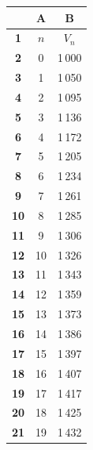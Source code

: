 \documentclass[10pt]{article}
\begin{document}
\begin{minipage}[t]{0.2\textwidth}
\vspace{0pt}
\centering
\renewcommand{\arraystretch}{1.2}
\begin{tabular}{|>{\columncolor{lightgray}}c|c|c|}
\hline
\rowcolor{lightgray}
\textbf{} & \textbf{A} & \textbf{B} \\ \hline
\textbf{1} & $n$ & $V_n$ \\ \hline
\textbf{2} & 0 & 1\,000 \\ \hline
\textbf{3} & 1 & 1\,050 \\ \hline
\textbf{4} & 2 & 1\,095 \\ \hline
\textbf{5} & 3 & 1\,136 \\ \hline
\textbf{6} & 4 & 1\,172 \\ \hline
\textbf{7} & 5 & 1\,205 \\ \hline
\textbf{8} & 6 & 1\,234 \\ \hline
\textbf{9} & 7 & 1\,261 \\ \hline
\textbf{10} & 8 & 1\,285 \\ \hline
\textbf{11} & 9 & 1\,306 \\ \hline
\textbf{12} & 10 & 1\,326 \\ \hline
\textbf{13} & 11 & 1\,343 \\ \hline
\textbf{14} & 12 & 1\,359 \\ \hline
\textbf{15} & 13 & 1\,373 \\ \hline
\textbf{16} & 14 & 1\,386 \\ \hline
\textbf{17} & 15 & 1\,397 \\ \hline
\textbf{18} & 16 & 1\,407 \\ \hline
\textbf{19} & 17 & 1\,417 \\ \hline
\textbf{20} & 18 & 1\,425 \\ \hline
\textbf{21} & 19 & 1\,432 \\ \hline
\end{tabular}
\end{minipage}
\end{document}
